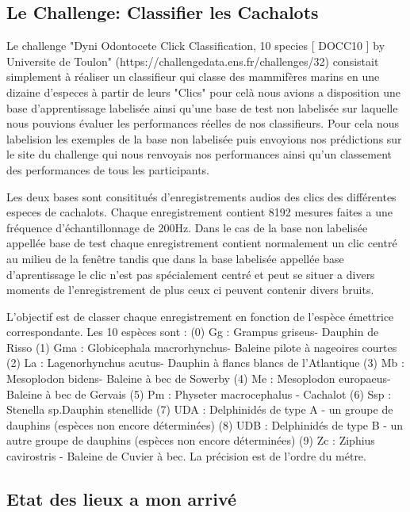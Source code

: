 \hypertarget{Le-Challenge}{%
\subsection{Le Challenge: Classifier les Cachalots}\label{Le-Challenge}}

Le challenge "Dyni Odontocete Click Classification, 10 species [ DOCC10 ]
by Universite de Toulon" (https://challengedata.ens.fr/challenges/32) consistait simplement à réaliser un classifieur qui classe des mammifères marins en une dizaine d'especes à partir de leurs "Clics" pour celà nous avions a disposition une base d'apprentissage labelisée ainsi qu'une base de test non labelisée sur laquelle nous pouvions évaluer les performances réelles de nos classifieurs. Pour cela nous labelision les exemples de la base non labelisée puis envoyions nos prédictions sur le site du challenge qui nous renvoyais nos performances ainsi qu'un classement des performances de tous les participants.

Les deux bases sont consititués d'enregistrements audios des clics des différentes especes de cachalots. Chaque enregistrement contient 8192 mesures faites a une fréquence d'échantillonnage de 200Hz. Dans le cas de la base non labelisée appellée base de test chaque enregistrement contient normalement un clic centré au milieu de la fenêtre tandis que dans la base labelisée appellée base d'aprentissage le clic n'est pas spécialement centré et peut se situer a divers moments de l'enregistrement de plus ceux ci peuvent contenir divers bruits.

L'objectif est de classer chaque enregistrement en fonction de l'espèce émettrice correspondante. Les 10 espèces sont : (0) Gg : Grampus griseus- Dauphin de Risso (1) Gma : Globicephala macrorhynchus- Baleine pilote à nageoires courtes (2) La : Lagenorhynchus acutus- Dauphin à flancs blancs de l'Atlantique (3) Mb : Mesoplodon bidens- Baleine à bec de Sowerby (4) Me : Mesoplodon europaeus- Baleine à bec de Gervais (5) Pm : Physeter macrocephalus - Cachalot (6) Ssp : Stenella sp.Dauphin stenellide (7) UDA : Delphinidés de type A - un groupe de dauphins (espèces non encore déterminées) (8) UDB : Delphinidés de type B - un autre groupe de dauphins (espèces non encore déterminées) (9) Zc : Ziphius cavirostris - Baleine de Cuvier à bec. La précision est de l'ordre du métre.


\hypertarget{Etat-des-lieux-lors-de-mon-arrivuxe9}{%
\subsection{Etat des lieux a mon arrivé}
\label{Etat-des-lieux-lors-de-mon-arrivuxe9}}

